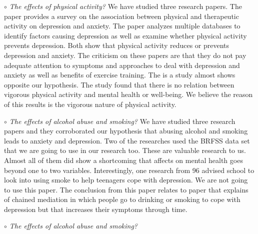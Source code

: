 \documentclass[letterpaper, 10 pt, conference]{ieeeconf}  %
\begin{document}
\par\noindent\textit{$\circ$ The effects of physical activity?}\newline
We have studied three research papers.  
The \cite{strohle2009physical} paper provides a survey on the association 
between physical and therapeutic activity on depression and anxiety. 
The \cite{mammen2013physical} paper analyzes multiple databases to identify factors causing depression as 
well as examine whether physical activity prevents depression. Both show that
physical activity reduces or prevents depression and anxiety. 
The criticism on these papers are that they do not pay adequate attention to symptoms 
and approaches to deal with depression and anxiety as well as benefits of exercise training.
The \cite{van2013exploratory} is a study almost shows opposite our hypothesis. The study found that there is no 
relation between vigorous physical activity and mental health or well-being. We believe 
the reason of this results is the vigorous nature of physical activity. 


\par\noindent\textit{$\circ$ The effects of alcohol abuse and smoking?}\newline
We have studied three research papers 
\cite{jia2018associations}\cite{strine2008depression}\cite{allan2015effects}
and they corroborated our hypothesis that abusing alcohol and smoking leads to anxiety and depression. Two of the 
researches used the BRFSS data set that we are going to use in our research too. These are valuable research to us. Almost all of them did show a shortcoming that 
affects on mental health goes beyond one to two variables. Interestingly, one research 
from 96 advised school to look into using smoke to help teenagers cope with depression. We are not going to use this paper. The conclusion from this paper relates to paper \cite{patton1996smoking} that explains 
of chained mediation in which people go to drinking or smoking to cope with depression but that 
increases their symptoms through time.

\par\noindent\textit{$\circ$ The effects of alcohol abuse and smoking?}\newline


%
\captionsetup[figure]{labelformat=empty}
\clearpage 
\begin{figure}[hbt!]
        \centering
        
        \addvspace{250pt}
        
        \hspace{-10cm}
        
        \caption{}
        \label{fig:schedule}
\end{figure}

\clearpage 




\end{document}
